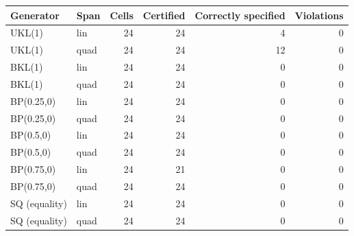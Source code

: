 \begin{tabular}{llrrrr}
\hline
Generator & Span & Cells & Certified & Correctly specified & Violations \\
\hline
UKL(1) & lin & 24 & 24 & 4 & 0 \\
UKL(1) & quad & 24 & 24 & 12 & 0 \\
BKL(1) & lin & 24 & 24 & 0 & 0 \\
BKL(1) & quad & 24 & 24 & 0 & 0 \\
BP(0.25,0) & lin & 24 & 24 & 0 & 0 \\
BP(0.25,0) & quad & 24 & 24 & 0 & 0 \\
BP(0.5,0) & lin & 24 & 24 & 0 & 0 \\
BP(0.5,0) & quad & 24 & 24 & 0 & 0 \\
BP(0.75,0) & lin & 24 & 21 & 0 & 0 \\
BP(0.75,0) & quad & 24 & 24 & 0 & 0 \\
\hline
SQ (equality) & lin & 24 & 24 & 0 & 0 \\
SQ (equality) & quad & 24 & 24 & 0 & 0 \\
\hline
\end{tabular}
